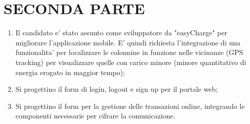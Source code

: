 \documentclass[a4paper,12pt]{article}
\begin{document}
\section{\textbf{SECONDA PARTE}} 
\begin{enumerate}
\item Il candidato e' stato assunto come sviluppatore da "easyCharge" per 
migliorare l'applicazione mobile. E' quindi richiesta l'integrazione di una 
funzionalita' per localizzare le colonnine in funzione nelle vicinanze (GPS
tracking) per visualizzare quelle con carico minore (minore quantitativo di
energia erogato in maggior tempo);
\item Si progettino il form di login, logout e sign up per il portale web;
\item Si progettino il form per la gestione delle transazioni online, integrando
le componenti necessarie per cifrare la comunicazione.
\end{enumerate}
\end{document}
